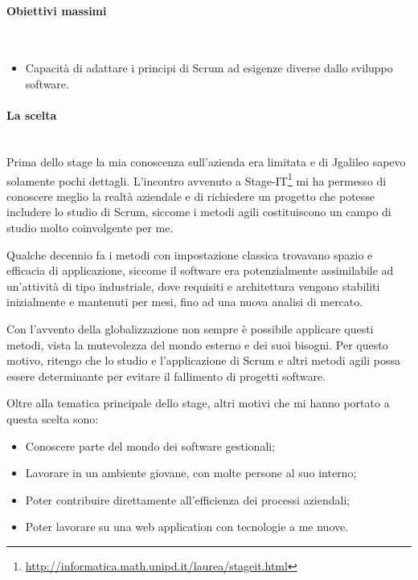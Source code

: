 \paragraph{Obiettivi massimi} \mbox{} \\

\begin{itemize}
\item Capacità di adattare i principi di Scrum ad esigenze diverse dallo
  sviluppo software.
\end{itemize}

\paragraph{La scelta} \mbox{} \\

Prima dello stage la mia conoscenza sull'azienda era limitata e di Jgalileo
sapevo solamente pochi dettagli.
L'incontro avvenuto a
Stage-IT\footnote{\url{http://informatica.math.unipd.it/laurea/stageit.html}}
mi ha permesso di conoscere meglio la realtà aziendale e di richiedere un
progetto che potesse includere lo studio di Scrum, siccome i metodi agili
costituiscono un campo di studio molto coinvolgente per me.

Qualche decennio fa i metodi con impostazione classica trovavano spazio
e efficacia di applicazione, siccome il software era potenzialmente
assimilabile ad un'attività di tipo industriale, dove requisiti e architettura
vengono stabiliti inizialmente e mantenuti per mesi, fino ad una nuova analisi
di mercato.

Con l'avvento della globalizzazione non sempre è possibile applicare questi
metodi, vista la mutevolezza del mondo esterno e dei suoi bisogni. Per questo
motivo, ritengo che lo studio e l'applicazione di Scrum e altri metodi
agili possa essere determinante per evitare il fallimento di progetti
software.

Oltre alla tematica principale dello stage, altri motivi che mi hanno portato
a questa scelta sono:

\begin{itemize}
\item Conoscere parte del mondo dei software gestionali;
\item Lavorare in un ambiente giovane, con molte persone al suo interno;
\item Poter contribuire direttamente all'efficienza dei processi aziendali;
\item Poter lavorare su una web application con tecnologie a me nuove.
\end{itemize}

